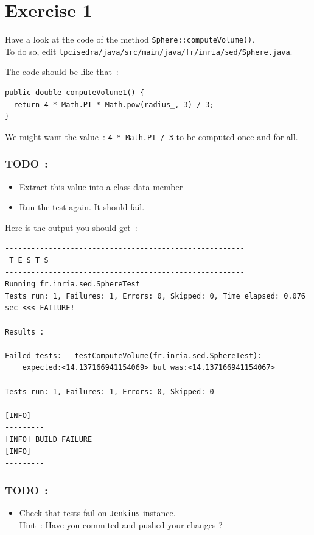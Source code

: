 \documentclass{article}
\begin{document}
\section{Exercise 1}

Have a look at the code of the method \texttt{Sphere::computeVolume()}.\\
To do so, edit \texttt{tpcisedra/java/src/main/java/fr/inria/sed/Sphere.java}.

The code should be like that~:
\begin{lstlisting}
public double computeVolume1() {
  return 4 * Math.PI * Math.pow(radius_, 3) / 3;
}
\end{lstlisting}


We might want the value~: \verb?4 * Math.PI / 3? to be computed once and for all.

\subsubsection{TODO~:}
\begin{itemize}
\item Extract this value into a class data member
\item Run the test again. It should fail.
\end{itemize}

Here is the output you should get~:
\begin{lstlisting}
-------------------------------------------------------
 T E S T S
-------------------------------------------------------
Running fr.inria.sed.SphereTest
Tests run: 1, Failures: 1, Errors: 0, Skipped: 0, Time elapsed: 0.076 sec <<< FAILURE!

Results :

Failed tests:   testComputeVolume(fr.inria.sed.SphereTest):
    expected:<14.137166941154069> but was:<14.137166941154067>

Tests run: 1, Failures: 1, Errors: 0, Skipped: 0

[INFO] ------------------------------------------------------------------------
[INFO] BUILD FAILURE
[INFO] ------------------------------------------------------------------------
\end{lstlisting}

\subsubsection{TODO~:}
\begin{itemize}
\item Check that tests fail on \texttt{Jenkins} instance.\\
Hint~: Have you commited and pushed your changes ?
\end{itemize}
\end{document}
